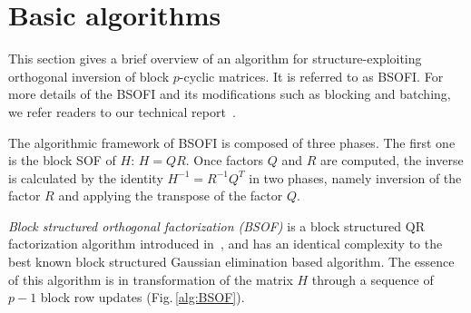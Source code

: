 \documentclass{llncs}
\newcommand{\editDel}[1]{}
\begin{document}
\section{Basic algorithms}
\label{sec:algorithm}

This section gives a brief overview of an algorithm for 
structure-exploiting orthogonal inversion 
of block $p$-cyclic matrices. It is referred to as BSOFI. 
For more details of the BSOFI and its modifications such as blocking and batching, 
we refer readers to our technical report~\cite{GogolenkoBai13}.

The algorithmic framework of BSOFI is composed of three phases. 
The first one is the block SOF of $H$: $H = QR$.
Once factors $Q$ and $R$ are computed, 
the inverse is calculated by the identity $H^{-1} = R^{-1}Q^T$
in two phases, namely inversion of the factor $R$ 
and applying the transpose of the factor $Q$.

\textit{Block structured orthogonal factorization (BSOF)} 
is a block structured QR factorization algorithm introduced 
in~\cite{Wright92BSOF}, and has an identical complexity to the best known 
block structured Gaussian elimination based algorithm. 
The essence of this algorithm is 
in transformation of the matrix $H$ 
through a sequence of $p-1$ block row updates (Fig.\,\ref{alg:BSOF}). 
\editDel{In the $k$th step, we treat $k$th and $(k+1)$th block rows of $H$.
At first, we perform the QR factorization of 
$2n$ by $n$ submatrix $[\tilde{A}_k^T, B_k^T]^T$ 
using Householder reflectors 
and then we apply the computed Householder reflectors from left 
in the reversed order to the selected non-zero block columns of the rows. }
\end{document}
